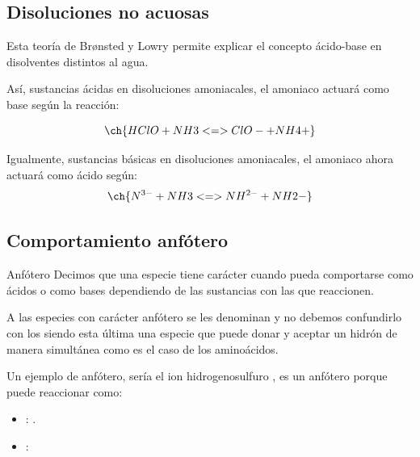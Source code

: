     \subsection{Disoluciones no acuosas}\label{subsec:disoluciones-no-acuosas}

    Esta teoría de Br\o{}nsted y Lowry permite explicar el concepto ácido-base en disolventes distintos al agua.

    Así, sustancias ácidas en disoluciones amoniacales, el amoniaco actuará como base según la reacción:

    \begin{equation*}
        \ch{HClO + NH3 <=> ClO- + NH4+}
    \end{equation*}

    Igualmente, sustancias básicas en disoluciones amoniacales, el amoniaco ahora actuará como ácido según:
    \begin{equation*}
        \ch{N^{3-} + NH3 <=> NH^{2-} + NH2-}
    \end{equation*}

    \subsection{Comportamiento anfótero}\label{subsec:comportamiento-anfotero}

    \begin{center}
        \begin{definicion}[width=0.9\textwidth]{Anfótero}
            Decimos que una especie tiene carácter  cuando pueda comportarse como ácidos o como bases dependiendo de las sustancias con las que reaccionen.
        \end{definicion}
    \end{center}


    A las especies con carácter anfótero se les denominan  y no debemos confundirlo con los  siendo esta última una especie que puede donar y aceptar un hidrón de manera simultánea como es el caso de los aminoácidos.

    Un ejemplo de anfótero, sería el ion hidrogenosulfuro , es un anfótero porque puede reaccionar como:
    \begin{itemize}
        \item {}: \hspace{2mm}.
        \item {}: \hspace{2mm}
    \end{itemize}


